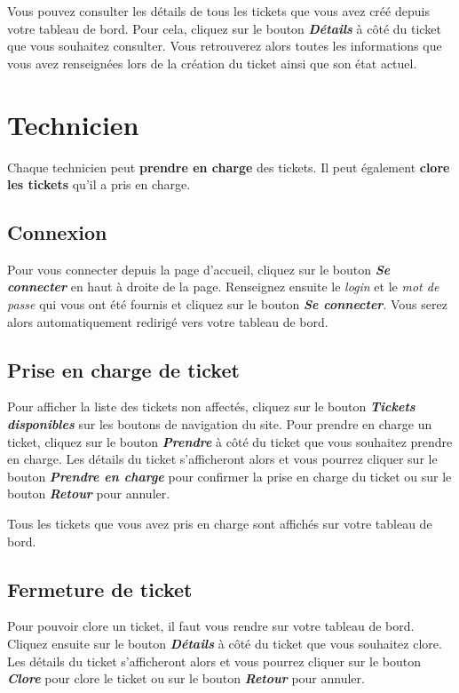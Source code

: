 \documentclass[12pt, a4paper]{article}
\begin{document}
Vous pouvez consulter les détails de tous les tickets que vous avez créé depuis votre tableau de bord.
Pour cela, cliquez sur le bouton \textit{\textbf{Détails}} à côté du ticket que vous souhaitez consulter.
Vous retrouverez alors toutes les informations que vous avez renseignées lors de la création du ticket ainsi que son état actuel.

\section{Technicien}

Chaque technicien peut \textbf{prendre en charge} des tickets. Il peut également \textbf{clore les tickets} qu'il a pris en charge.

\subsection*{Connexion}

Pour vous connecter depuis la page d'accueil, cliquez sur le bouton \textit{\textbf{Se connecter}} en haut à droite de la page.
Renseignez ensuite le \textit{login} et le \textit{mot de passe} qui vous ont été fournis et cliquez sur le bouton \textit{\textbf{Se connecter}}.
Vous serez alors automatiquement redirigé vers votre tableau de bord.

\subsection*{Prise en charge de ticket}

Pour afficher la liste des tickets non affectés, cliquez sur le bouton \textit{\textbf{Tickets disponibles}} sur les boutons de navigation du site.
Pour prendre en charge un ticket, cliquez sur le bouton \textit{\textbf{Prendre}} à côté du ticket que vous souhaitez prendre en charge.
Les détails du ticket s'afficheront alors et vous pourrez cliquer sur le bouton \textit{\textbf{Prendre en charge}} pour confirmer la prise en charge du ticket ou sur le bouton \textit{\textbf{Retour}} pour annuler.

\bigskip
\noindent Tous les tickets que vous avez pris en charge sont affichés sur votre tableau de bord.

\subsection*{Fermeture de ticket}

Pour pouvoir clore un ticket, il faut vous rendre sur votre tableau de bord.
Cliquez ensuite sur le bouton \textit{\textbf{Détails}} à côté du ticket que vous souhaitez clore.
Les détails du ticket s'afficheront alors et vous pourrez cliquer sur le bouton \textit{\textbf{Clore}} pour clore le ticket ou sur le bouton \textit{\textbf{Retour}} pour annuler.
\end{document}
